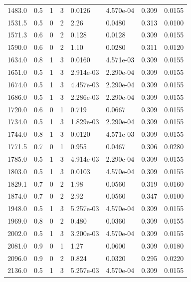 \documentclass[preview]{standalone}
\begin{document}
{{{\begin{tabular}{L{1.2cm}C{1.2cm} C{0.3cm}C{0.5cm} C{1.4cm}C{1.4cm} C{1.4cm}C{1.4cm}}
  1483.0  &   0.5  & 1     &  3 &  0.0126  & 4.570e-04  & 0.309 &  0.0155   \\ 
  1531.5  &   0.5  & 0     &  2 &  2.26  & 0.0480  & 0.313 &  0.0100   \\ 
  1571.3  &   0.6  & 0     &  2 &  0.128  & 0.0128  & 0.309 &  0.0155   \\ 
  1590.0  &   0.6  & 0     &  2 &  1.10  & 0.0280  & 0.311 &  0.0120   \\ 
  1634.0  &   0.8  & 1     &  3 &  0.0160  & 4.571e-03  & 0.309 &  0.0155   \\ 
  1651.0  &   0.5  & 1     &  3 &  2.914e-03  & 2.290e-04  & 0.309 &  0.0155   \\ 
  1674.0  &   0.5  & 1     &  3 &  4.457e-03  & 2.290e-04  & 0.309 &  0.0155   \\ 
  1686.0  &   0.5  & 1     &  3 &  2.286e-03  & 2.290e-04  & 0.309 &  0.0155   \\ 
  1720.0  &   0.6  & 0     &  1 &  0.719  & 0.0667  & 0.309 &  0.0155   \\ 
  1734.0  &   0.5  & 1     &  3 &  1.829e-03  & 2.290e-04  & 0.309 &  0.0155   \\ 
  1744.0  &   0.8  & 1     &  3 &  0.0120  & 4.571e-03  & 0.309 &  0.0155   \\ 
  1771.5  &   0.7  & 0     &  1 &  0.955  & 0.0467  & 0.306 &  0.0280   \\ 
  1785.0  &   0.5  & 1     &  3 &  4.914e-03  & 2.290e-04  & 0.309 &  0.0155   \\ 
  1803.0  &   0.5  & 1     &  3 &  0.0103  & 4.570e-04  & 0.309 &  0.0155   \\ 
  1829.1  &   0.7  & 0     &  2 &  1.98  & 0.0560  & 0.319 &  0.0160   \\ 
  1874.0  &   0.7  & 0     &  2 &  2.92  & 0.0560  & 0.347 &  0.0100   \\ 
  1948.0  &   0.5  & 1     &  3 &  5.257e-03  & 4.570e-04  & 0.309 &  0.0155   \\ 
  1969.0  &   0.8  & 0     &  2 &  0.480  & 0.0360  & 0.309 &  0.0155   \\ 
  2002.0  &   0.5  & 1     &  3 &  3.200e-03  & 4.570e-04  & 0.309 &  0.0155   \\ 
  2081.0  &   0.9  & 0     &  1 &  1.27  & 0.0600  & 0.309 &  0.0180   \\ 
  2096.0  &   0.9  & 0     &  2 &  0.824  & 0.0320  & 0.295 &  0.0220   \\ 
  2136.0  &   0.5  & 1     &  3 &  5.257e-03  & 4.570e-04  & 0.309 &  0.0155   \\ 

\end{tabular}}}}
\end{document}
